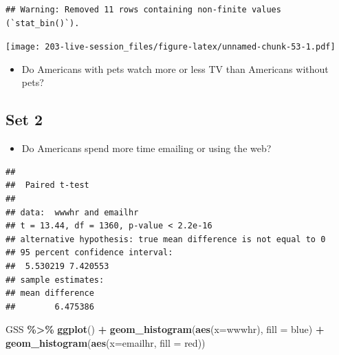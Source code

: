 \documentclass[
]{book}
\newenvironment{Shaded}{\begin{snugshade}}{\end{snugshade}}
\newcommand{\AttributeTok}[1]{\textcolor[rgb]{0.13,0.29,0.53}{#1}}
\newcommand{\ConstantTok}[1]{\textcolor[rgb]{0.56,0.35,0.01}{#1}}
\newcommand{\FunctionTok}[1]{\textcolor[rgb]{0.13,0.29,0.53}{\textbf{#1}}}
\newcommand{\NormalTok}[1]{#1}
\newcommand{\SpecialCharTok}[1]{\textcolor[rgb]{0.81,0.36,0.00}{\textbf{#1}}}
\newcommand{\StringTok}[1]{\textcolor[rgb]{0.31,0.60,0.02}{#1}}
\providecommand{\tightlist}{%
  \setlength{\itemsep}{0pt}\setlength{\parskip}{0pt}}
\theoremstyle{definition}
\theoremstyle{definition}
\theoremstyle{definition}
\theoremstyle{definition}
\theoremstyle{remark}
\begin{document}
\begin{verbatim}
## Warning: Removed 11 rows containing non-finite values (`stat_bin()`).
\end{verbatim}

\texttt{[image: 203-live-session\_files/figure-latex/unnamed-chunk-53-1.pdf]}

\begin{itemize}
\tightlist
\item
  Do Americans with pets watch more or less TV than Americans without pets?
\end{itemize}

\hypertarget{set-2}{%
\subsection{Set 2}\label{set-2}}

\begin{itemize}
\tightlist
\item
  Do Americans spend more time emailing or using the web?
\end{itemize}

\begin{Shaded}
\end{Shaded}

\begin{verbatim}
## 
##  Paired t-test
## 
## data:  wwwhr and emailhr
## t = 13.44, df = 1360, p-value < 2.2e-16
## alternative hypothesis: true mean difference is not equal to 0
## 95 percent confidence interval:
##  5.530219 7.420553
## sample estimates:
## mean difference 
##        6.475386
\end{verbatim}

\begin{Shaded}
\begin{Highlighting}[]
\NormalTok{GSS }\SpecialCharTok{\%\textgreater{}\%} 
  \FunctionTok{ggplot}\NormalTok{() }\SpecialCharTok{+} 
  \FunctionTok{geom\_histogram}\NormalTok{(}\FunctionTok{aes}\NormalTok{(}\AttributeTok{x=}\NormalTok{wwwhr), }\AttributeTok{fill =} \StringTok{\textquotesingle{}blue\textquotesingle{}}\NormalTok{) }\SpecialCharTok{+} 
  \FunctionTok{geom\_histogram}\NormalTok{(}\FunctionTok{aes}\NormalTok{(}\AttributeTok{x=}\NormalTok{emailhr, }\AttributeTok{fill =} \StringTok{\textquotesingle{}red\textquotesingle{}}\NormalTok{))}
\end{Highlighting}
\end{Shaded}
\end{document}
